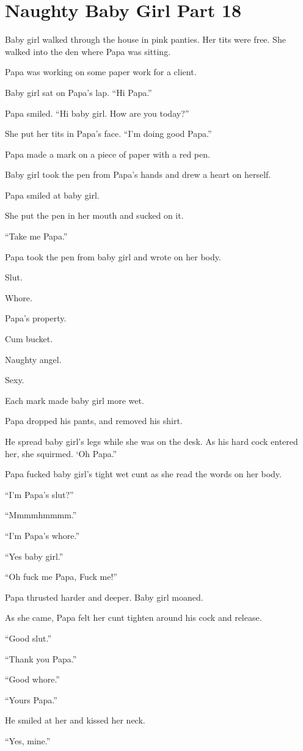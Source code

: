 \section{Naughty Baby Girl Part 18}

    Baby girl walked through the house in pink panties. Her tits were free. She walked into the den where Papa was sitting.

    Papa was working on some paper work for a client.

    Baby girl sat on Papa’s lap. “Hi Papa.”

    Papa smiled. “Hi baby girl. How are you today?”

    She put her tits in Papa’s face. “I’m doing good Papa.”

    Papa made a mark on a piece of paper with a red pen.

    Baby girl took the pen from Papa’s hands and drew a heart on herself.

    Papa smiled at baby girl.

    She put the pen in her mouth and sucked on it.

    “Take me Papa.”

    Papa took the pen from baby girl and wrote on her body.

    Slut.

    Whore.

    Papa’s property.

    Cum bucket.

    Naughty angel.

    Sexy.

    Each mark made baby girl more wet.

    Papa dropped his pants, and removed his shirt.

    He spread baby girl’s legs while she was on the desk. As his hard cock entered her, she squirmed. ‘Oh Papa.”

    Papa fucked baby girl’s tight wet cunt as she read the words on her body.

    “I’m Papa’s slut?”

    “Mmmmhmmmm.”

    “I’m Papa’s whore.”

    “Yes baby girl.”

    “Oh fuck me Papa, Fuck me!”

    Papa thrusted harder and deeper. Baby girl moaned.

    As she came, Papa felt her cunt tighten around his cock and release.

    “Good slut.”

    “Thank you Papa.”

    “Good whore.”

    “Yours Papa.”

    He smiled at her and kissed her neck.

    “Yes, mine.”

